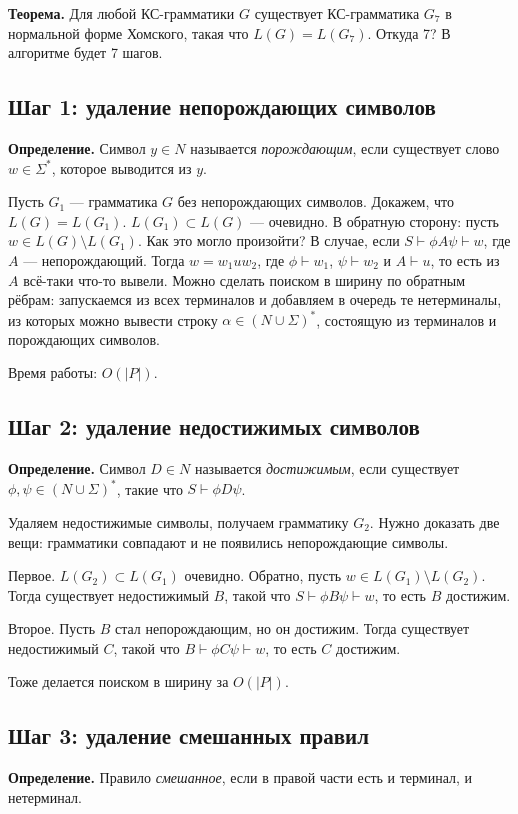 \textbf{Теорема.} Для любой КС-грамматики $G$ существует КС-грамматика $G_7$ в нормальной форме Хомского, такая что $L(G) = L(G_7)$.
Откуда 7? В алгоритме будет 7 шагов.

\subsection{Шаг 1: удаление непорождающих символов}
\textbf{Определение.} Символ $y \in N$ называется \textit{порождающим}, если существует слово $w \in \Sigma^*$, которое выводится из $y$.

Пусть $G_1$ --- грамматика $G$ без непорождающих символов.
Докажем, что $L(G) = L(G_1)$.
$L(G_1) \subset L(G)$ --- очевидно. В обратную сторону: пусть $w \in L(G) \setminus L(G_1)$.
Как это могло произойти? В случае, если $S \vdash \phi A \psi \vdash w$, где $A$ --- непорождающий.
Тогда $w = w_1 u w_2$, где $\phi \vdash w_1$, $\psi \vdash w_2$ и $A \vdash u$, то есть из $A$ всё-таки что-то вывели.
Можно сделать поиском в ширину по обратным рёбрам: запускаемся из всех терминалов и добавляем в очередь те нетерминалы, из которых можно вывести строку $\alpha \in (N \cup \Sigma)^*$, состоящую из терминалов и порождающих символов.

Время работы: $O(|P|)$.

\subsection{Шаг 2: удаление недостижимых символов}
\textbf{Определение.} Символ $D \in N$ называется \textit{достижимым}, если существует $\phi, \psi \in (N \cup \Sigma)^*$, такие что $S \vdash \phi D \psi$.

Удаляем недостижимые символы, получаем грамматику $G_2$.
Нужно доказать две вещи: грамматики совпадают и не появились непорождающие символы.

Первое. $L(G_2) \subset L(G_1)$ очевидно. Обратно, пусть $w \in L(G_1) \setminus L(G_2)$.
Тогда существует недостижимый $B$, такой что $S \vdash \phi B \psi \vdash w$, то есть $B$ достижим.

Второе. Пусть $B$ стал непорождающим, но он достижим.
Тогда существует недостижимый $C$, такой что $B \vdash \phi C \psi \vdash w$, то есть $C$ достижим.

Тоже делается поиском в ширину за $O(|P|)$.

\subsection{Шаг 3: удаление смешанных правил}
\textbf{Определение.} Правило \textit{смешанное}, если в правой части есть и терминал, и нетерминал.

